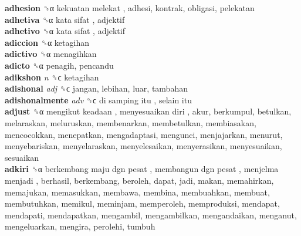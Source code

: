 \textbf{adhesion} ␝α   kekuatan melekat , adhesi, kontrak, obligasi, pelekatan  \\
\textbf{adhetiva} ␝α   kata sifat , adjektif  \\
\textbf{adhetivo} ␝α   kata sifat , adjektif  \\
\textbf{adiccion} ␝α  ketagihan  \\
\textbf{adictivo} ␝α  menagihkan  \\
\textbf{adicto} ␝α  penagih, pencandu  \\
\textbf{adikshon} \emph{n}  ␝ϲ  ketagihan  \\
\textbf{adishonal} \emph{adj}  ␝ϲ  jangan, lebihan, luar, tambahan  \\
\textbf{adishonalmente} \emph{adv}  ␝ϲ   di samping itu ,  selain itu   \\
\textbf{adjust} ␝α   mengikut keadaan ,  menyesuaikan diri , akur, berkumpul, betulkan, melaraskan, meluruskan, membenarkan, membetulkan, membiasakan, mencocokkan, menepatkan, mengadaptasi, mengunci, menjajarkan, menurut, menyebariskan, menyelaraskan, menyelesaikan, menyerasikan, menyesuaikan, sesuaikan  \\
\textbf{adkiri} ␝α   berkembang maju dgn pesat ,  membangun dgn pesat ,  menjelma menjadi , berhasil, berkembang, beroleh, dapat, jadi, makan, memahirkan, memajukan, memasukkan, membawa, membina, membuahkan, membuat, membutuhkan, memikul, meminjam, memperoleh, memproduksi, mendapat, mendapati, mendapatkan, mengambil, mengambilkan, mengandaikan, menganut, mengeluarkan, mengira, perolehi, tumbuh  \\
